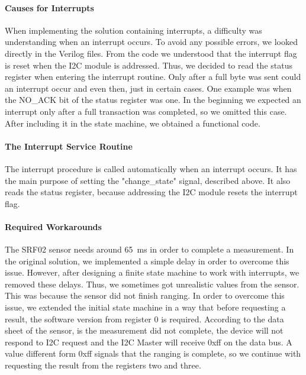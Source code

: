 			\paragraph{Causes for Interrupts} %
			\label{par:causes_for_interrupts}
				When implementing the solution containing interrupts, a difficulty was understanding when an interrupt occurs. To avoid any possible errors, we looked directly in the Verilog files. From the code we understood that the interrupt flag is reset when the I2C module is addressed. Thus, we decided to read the status register when entering the interrupt routine. Only after a full byte was sent could an interrupt occur and even then, just in certain cases. One example was when the NO\_ACK bit of the status register was one. In the beginning we expected an interrupt only after a full transaction was completed, so we omitted this case. After including it in the state machine, we obtained a functional code.  
			
			\paragraph{The Interrupt Service Routine} %
			\label{par:impl_isr}
				The interrupt procedure is called automatically when an interrupt occurs. It has the main purpose of setting the "change\_state" signal, described above. It also reads the status register, because addressing the I2C module resets the interrupt flag.

			\paragraph{Required Workarounds} %
			\label{par:required_workarounds}
				The SRF02 sensor needs around \SI{65}{\milli\second} in order to complete a measurement. In the original solution, we implemented a simple delay in order to overcome this issue. However, after designing a finite state machine to work with interrupts, we removed these delays. Thus, we sometimes got unrealistic values from the sensor. This was because the sensor did not finish ranging.
				In order to overcome this issue, we extended the initial state machine in a way that before requesting a result, the software version from register 0 is required. According to the data sheet of the sensor, is the measurement did not complete, the device will not respond to I2C request and the I2C Master will receive 0xff on the data bus. A value different form 0xff signals that the ranging is complete, so we continue with requesting the result from the registers two and three.

